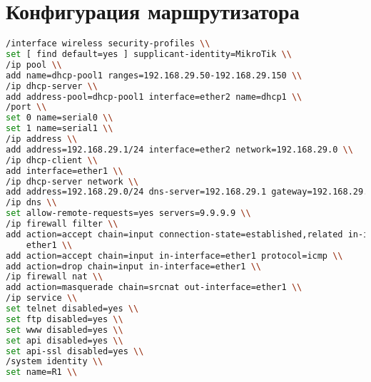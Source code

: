 \section{Конфигурация маршрутизатора}

\begin{lstlisting}[language=bash]
/interface wireless security-profiles \\
set [ find default=yes ] supplicant-identity=MikroTik \\
/ip pool \\
add name=dhcp-pool1 ranges=192.168.29.50-192.168.29.150 \\
/ip dhcp-server \\
add address-pool=dhcp-pool1 interface=ether2 name=dhcp1 \\
/port \\
set 0 name=serial0 \\
set 1 name=serial1 \\
/ip address \\
add address=192.168.29.1/24 interface=ether2 network=192.168.29.0 \\
/ip dhcp-client \\
add interface=ether1 \\
/ip dhcp-server network \\
add address=192.168.29.0/24 dns-server=192.168.29.1 gateway=192.168.29.1 \\
/ip dns \\
set allow-remote-requests=yes servers=9.9.9.9 \\
/ip firewall filter \\
add action=accept chain=input connection-state=established,related in-interface=\
    ether1 \\
add action=accept chain=input in-interface=ether1 protocol=icmp \\
add action=drop chain=input in-interface=ether1 \\
/ip firewall nat \\
add action=masquerade chain=srcnat out-interface=ether1 \\
/ip service \\
set telnet disabled=yes \\
set ftp disabled=yes \\
set www disabled=yes \\
set api disabled=yes \\
set api-ssl disabled=yes \\
/system identity \\
set name=R1 \\
\end{lstlisting}

